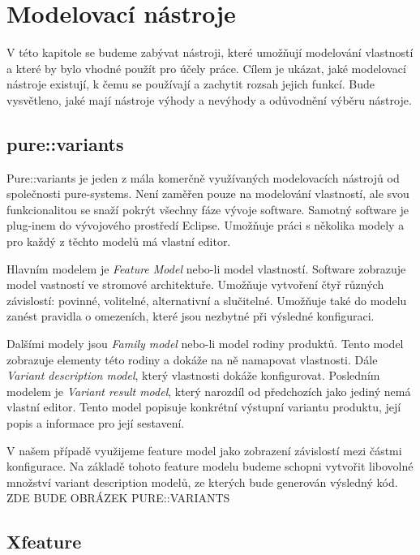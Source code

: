 \chapter{Modelovací nástroje}

V této kapitole se budeme zabývat nástroji, které umožňují modelování vlastností a které by bylo vhodné použít pro účely práce. Cílem je ukázat, jaké modelovací nástroje existují, k čemu se používají a zachytit rozsah jejich funkcí. Bude vysvětleno, jaké mají nástroje výhody a nevýhody a odůvodnění výběru nástroje.

\section{pure::variants}

Pure::variants je jeden z mála komerčně využívaných modelovacích nástrojů od společnosti pure-systems. Není zaměřen pouze na modelování vlastností, ale svou funkcionalitou se snaží pokrýt všechny fáze vývoje software. Samotný software je plug-inem do vývojového prostředí Eclipse. Umožňuje práci s několika modely a pro každý z těchto modelů má vlastní editor.

Hlavním modelem je \textit{Feature Model} nebo-li model vlastností. Software zobrazuje model vastností ve stromové architektuře. Umožňuje vytvoření čtyř různých závislostí: povinné, volitelné, alternativní a slučitelné. Umožňuje také do modelu zanést pravidla o omezeních, které jsou nezbytné při výsledné konfiguraci. 

Dalšími modely jsou \textit{Family model} nebo-li model rodiny produktů. Tento model zobrazuje elementy této rodiny a dokáže na ně namapovat vlastnosti. Dále \textit{Variant description model}, který vlastnosti dokáže konfigurovat. Posledním modelem je \textit{Variant result model}, který narozdíl od předchozích jako jediný nemá vlastní editor. Tento model popisuje konkrétní výstupní variantu produktu, její popis a informace pro její sestavení.

V našem případě využijeme feature model jako zobrazení závislostí mezi částmi konfigurace. Na základě tohoto feature modelu budeme schopni vytvořit libovolné množství variant description modelů, ze kterých bude generován výsledný kód. 
\newline
\newline
ZDE BUDE OBRÁZEK PURE::VARIANTS
\newline
\newline

\section{Xfeature}

